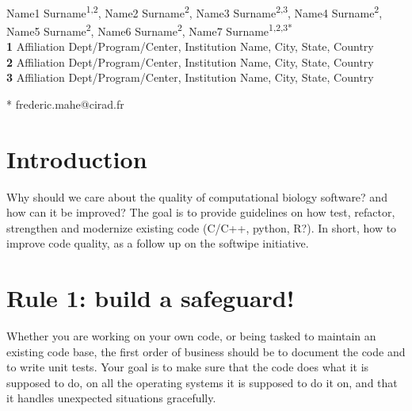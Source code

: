 \documentclass[10pt,letterpaper]{article}
\begin{document}
\vspace*{0.2in}

\begin{flushleft}
  {\Large
    \textbf{}
  }
  \newline
  \\
  Name1 Surname\textsuperscript{1,2},
  Name2 Surname\textsuperscript{2},
  Name3 Surname\textsuperscript{2,3},
  Name4 Surname\textsuperscript{2},
  Name5 Surname\textsuperscript{2},
  Name6 Surname\textsuperscript{2},
  Name7 Surname\textsuperscript{1,2,3*}
  \\
  \bigskip
  \textbf{1} Affiliation Dept/Program/Center, Institution Name, City, State, Country
  \\
  \textbf{2} Affiliation Dept/Program/Center, Institution Name, City, State, Country
  \\
  \textbf{3} Affiliation Dept/Program/Center, Institution Name, City, State, Country
  \\
  \bigskip

  * frederic.mahe@cirad.fr

\end{flushleft}

\linenumbers

\section*{Introduction}

Why should we care about the quality of computational biology
software? and how can it be improved? The goal is to provide
guidelines on how test, refactor, strengthen and modernize existing
code (C/C++, python, R?). In short, how to improve code quality, as a
follow up on the softwipe initiative.

\section*{Rule 1: build a safeguard!}

Whether you are working on your own code, or being tasked to maintain
an existing code base, the first order of business should be to
document the code and to write unit tests. Your goal is to make sure
that the code does what it is supposed to do, on all the operating
systems it is supposed to do it on, and that it handles unexpected
situations gracefully.
\end{document}

